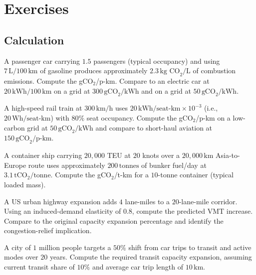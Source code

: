 \section{Exercises}

\subsection*{Calculation}

\begin{exercise}
A passenger car carrying $1.5$ passengers (typical occupancy) and using $7\,\text{L}/100\,\text{km}$ of gasoline produces approximately $2.3\,\text{kg CO}_2/\text{L}$ of combustion emissions. Compute the gCO$_2$/p-km. Compare to an electric car at $20\,\text{kWh}/100\,\text{km}$ on a grid at $300\,\text{gCO}_2/\text{kWh}$ and on a grid at $50\,\text{gCO}_2/\text{kWh}$.
\end{exercise}

\begin{exercise}
A high-speed rail train at $300\,\text{km/h}$ uses $20\,\text{kWh/seat-km} \times 10^{-3}$ (i.e., $20\,\text{Wh/seat-km}$) with $80\%$ seat occupancy. Compute the gCO$_2$/p-km on a low-carbon grid at $50\,\text{gCO}_2/\text{kWh}$ and compare to short-haul aviation at $150\,\text{gCO}_2/\text{p-km}$.
\end{exercise}

\begin{exercise}
A container ship carrying $20{,}000$ TEU at $20$ knots over a $20{,}000\,\text{km}$ Asia-to-Europe route uses approximately $200\,\text{tonnes}$ of bunker fuel/day at $3.1\,\text{tCO}_2/\text{tonne}$. Compute the gCO$_2$/t-km for a $10$-tonne container (typical loaded mass).
\end{exercise}

\begin{exercise}
A US urban highway expansion adds $4$ lane-miles to a $20$-lane-mile corridor. Using an induced-demand elasticity of $0.8$, compute the predicted VMT increase. Compare to the original capacity expansion percentage and identify the congestion-relief implication.
\end{exercise}

\begin{exercise}
A city of $1$ million people targets a $50\%$ shift from car trips to transit and active modes over $20$ years. Compute the required transit capacity expansion, assuming current transit share of $10\%$ and average car trip length of $10\,\text{km}$.
\end{exercise}

